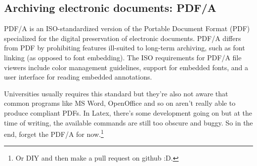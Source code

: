 \subsection{Archiving electronic documents: PDF/A}
PDF/A is an ISO-standardized version of the Portable Document Format (PDF) specialized for the digital preservation of electronic documents. PDF/A differs from PDF by prohibiting features ill-suited to long-term archiving, such as font linking (as opposed to font embedding). The ISO requirements for PDF/A file viewers include color management guidelines, support for embedded fonts, and a user interface for reading embedded annotations.

Universities usually requires this standard but they're also not aware that common programs like MS Word, OpenOffice and so on aren't really able to produce compliant PDFs. In Latex, there's some development going on but at the time of writing, the available commands are still too obscure and buggy. So in the end, forget the PDF/A for now.\footnote{Or DIY and then make a pull request on github :D.}
